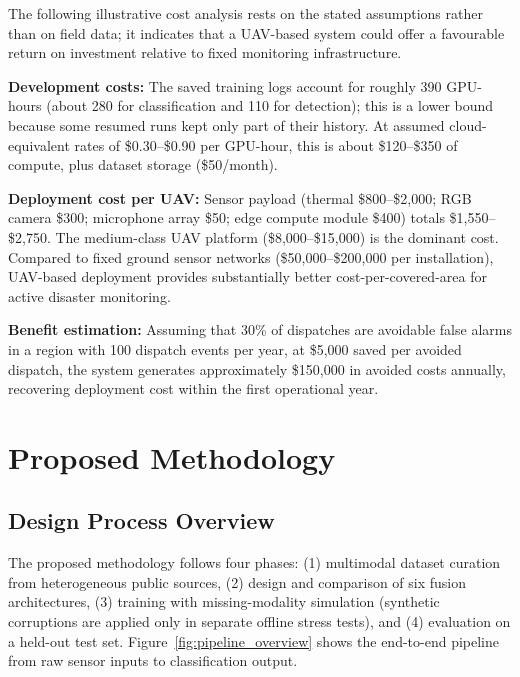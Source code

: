\documentclass[journal]{IEEEtran}
\begin{document}
The following illustrative cost analysis rests on the stated assumptions rather than on field data; it indicates that a UAV-based system could offer a favourable return on investment relative to fixed monitoring infrastructure.

\textbf{Development costs:} The saved training logs account for roughly 390 GPU-hours (about 280 for classification and 110 for detection); this is a lower bound because some resumed runs kept only part of their history. At assumed cloud-equivalent rates of \$0.30--\$0.90 per GPU-hour, this is about \$120--\$350 of compute, plus dataset storage (\$50/month).

\textbf{Deployment cost per UAV:} Sensor payload (thermal \$800--\$2,000; RGB camera \$300; microphone array \$50; edge compute module \$400) totals \$1,550--\$2,750. The medium-class UAV platform (\$8,000--\$15,000) is the dominant cost. Compared to fixed ground sensor networks (\$50,000--\$200,000 per installation), UAV-based deployment provides substantially better cost-per-covered-area for active disaster monitoring.

\textbf{Benefit estimation:} Assuming that 30\% of dispatches are avoidable false alarms in a region with 100 dispatch events per year, at \$5,000 saved per avoided dispatch, the system generates approximately \$150,000 in avoided costs annually, recovering deployment cost within the first operational year.


\section{Proposed Methodology}


\subsection{Design Process Overview}

The proposed methodology follows four phases: (1) multimodal dataset curation from heterogeneous public sources, (2) design and comparison of six fusion architectures, (3) training with missing-modality simulation (synthetic corruptions are applied only in separate offline stress tests), and (4) evaluation on a held-out test set. Figure~\ref{fig:pipeline_overview} shows the end-to-end pipeline from raw sensor inputs to classification output.
\end{document}
